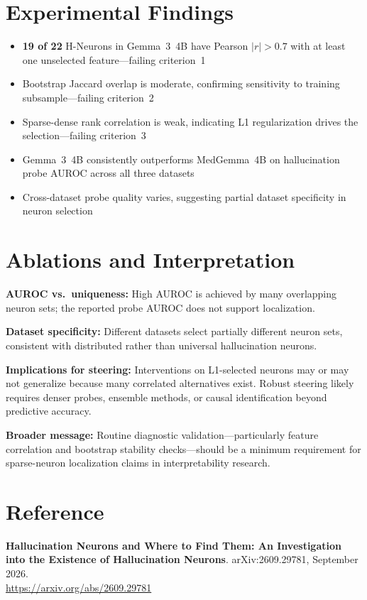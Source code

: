 \documentclass[10pt,twocolumn]{article}
\begin{document}
\section{Experimental Findings}

\begin{itemize}[itemsep=2pt,parsep=0pt]
  \item \textbf{19 of 22} H-Neurons in Gemma~3~4B have Pearson $|r|>0.7$
    with at least one unselected feature---failing criterion~1
  \item Bootstrap Jaccard overlap is moderate, confirming sensitivity to
    training subsample---failing criterion~2
  \item Sparse-dense rank correlation is weak, indicating L1 regularization
    drives the selection---failing criterion~3
  \item Gemma~3~4B consistently outperforms MedGemma~4B on hallucination
    probe AUROC across all three datasets
  \item Cross-dataset probe quality varies, suggesting partial dataset
    specificity in neuron selection
\end{itemize}

\section{Ablations and Interpretation}

\textbf{AUROC vs.\ uniqueness:} High AUROC is achieved by many overlapping
neuron sets; the reported probe AUROC does not support localization.

\textbf{Dataset specificity:} Different datasets select partially different
neuron sets, consistent with distributed rather than universal hallucination
neurons.

\textbf{Implications for steering:} Interventions on L1-selected neurons may
or may not generalize because many correlated alternatives exist. Robust
steering likely requires denser probes, ensemble methods, or causal
identification beyond predictive accuracy.

\textbf{Broader message:} Routine diagnostic validation---particularly feature
correlation and bootstrap stability checks---should be a minimum requirement
for sparse-neuron localization claims in interpretability research.

\section*{Reference}

\textbf{Hallucination Neurons and Where to Find Them: An Investigation
into the Existence of Hallucination Neurons}.
arXiv:2609.29781, September 2026.\\
\url{https://arxiv.org/abs/2609.29781}
\end{document}
